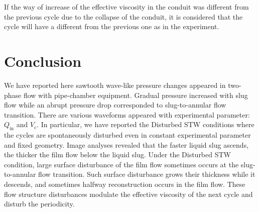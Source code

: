 \documentclass[aps,pre,preprint,groupedaddress,showkeys]{revtex4-2}
\begin{document}
If the way of increase of the effective viscosity in the conduit was different from the previous cycle due to the collapse of the conduit, it is considered that the cycle will have a different from the previous one as in the experiment.


\section{Conclusion}\label{con}
We have reported here sawtooth wave-like pressure changes appeared in two-phase flow with pipe-chamber equipment.
Gradual pressure increased with slug flow while an abrupt pressure drop corresponded to slug-to-annular flow transition.
There are various waveforms appeared with experimental parameter: $Q_\mathrm{in}$ and $V_\mathrm{c}$.
In particular, we have reported the Disturbed STW conditions where the cycles are spontaneously disturbed even in constant experimental parameter and fixed geometry.
Image analyses revealed that the faster liquid slug ascends, the thicker the film flow below the liquid slug.
Under the Disturbed STW condition, large surface disturbance of the film flow sometimes occurs at the slug-to-annular flow transition.
Such surface disturbance grows their thickness while it descends, and sometimes halfway reconstruction occurs in the film flow.
These flow structure disturbances modulate the effective viscosity of the next cycle and disturb the periodicity.
\end{document}
